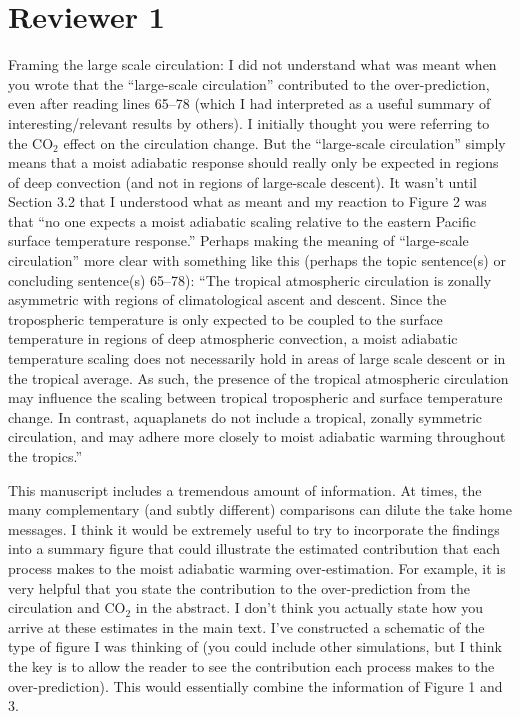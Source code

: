 \documentclass[11pt]{article}
\date{}
\title{}
\begin{document}
\section*{Reviewer 1}
\label{sec:org1f02072}
Framing the large scale circulation: I did not understand what was meant when you wrote that the ``large-scale circulation'' contributed to the over-prediction, even after reading lines 65--78 (which I had interpreted as a useful summary of interesting/relevant results by others). I initially thought you were referring to the CO\(_2\) effect on the circulation change. But the ``large-scale circulation'' simply means that a moist adiabatic response should really only be expected in regions of deep convection (and not in regions of large-scale descent). It wasn't until Section 3.2 that I understood what as meant and my reaction to Figure 2 was that ``no one expects a moist adiabatic scaling relative to the eastern Pacific surface temperature response.'' Perhaps making the meaning of ``large-scale circulation'' more clear with something like this (perhaps the topic sentence(s) or concluding sentence(s) 65--78): ``The tropical atmospheric circulation is zonally asymmetric with regions of climatological ascent and descent. Since the tropospheric temperature is only expected to be coupled to the surface temperature in regions of deep atmospheric convection, a moist adiabatic temperature scaling does not necessarily hold in areas of large scale descent or in the tropical average. As such, the presence of the tropical atmospheric circulation may influence the scaling between tropical tropospheric and surface temperature change. In contrast, aquaplanets do not include a tropical, zonally symmetric circulation, and may adhere more closely to moist adiabatic warming throughout the tropics.''

This manuscript includes a tremendous amount of information. At times, the many complementary (and subtly different) comparisons can dilute the take home messages. I think it would be extremely useful to try to incorporate the findings into a summary figure that could illustrate the estimated contribution that each process makes to the moist adiabatic warming over-estimation. For example, it is very helpful that you state the contribution to the over-prediction from the circulation and CO\(_2\) in the abstract. I don't think you actually state how you arrive at these estimates in the main text. I've constructed a schematic of the type of figure I was thinking of (you could include other simulations, but I think the key is to allow the reader to see the contribution each process makes to the over-prediction). This would essentially combine the information of Figure 1 and 3.
\end{document}
